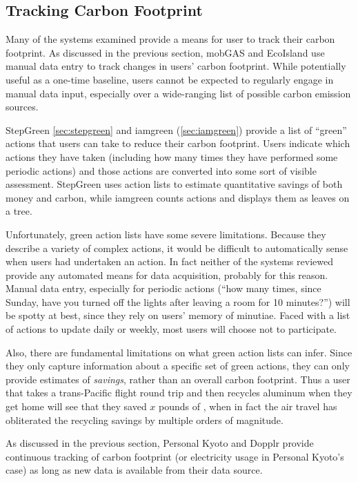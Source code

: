\subsection{Tracking Carbon Footprint}

Many of the systems examined provide a means for user to track their carbon footprint. As discussed in the previous section, mobGAS and  EcoIsland use manual data entry to track changes in users' carbon footprint. While potentially useful as a one-time baseline, users cannot be expected to regularly engage in manual data input, especially over a wide-ranging list of possible carbon emission sources.

StepGreen \autoref{sec:stepgreen} and iamgreen (\autoref{sec:iamgreen}) provide a list of ``green'' actions that users can take to reduce their carbon footprint. Users indicate which actions they have taken (including how many times they have performed some periodic actions) and those actions are converted into some sort of visible assessment. StepGreen uses action lists to estimate quantitative savings of both money and carbon, while iamgreen counts actions and displays them as leaves on a tree.

Unfortunately, green action lists have some severe limitations. Because they describe a variety of complex actions, it would be difficult to automatically sense when users had undertaken an action. In fact neither of the systems reviewed provide any automated means for data acquisition, probably for this reason. Manual data entry, especially for periodic actions (``how many times, since Sunday, have you turned off the lights after leaving a room for 10 minutes?'') will be spotty at best, since they rely on users' memory of minutiae. Faced with a list of actions to update daily or weekly, most users will choose not to participate.

Also, there are fundamental limitations on what green action lists can infer. Since they only capture information about a specific set of green actions, they can only provide estimates of \emph{savings}, rather than an overall carbon footprint. Thus a user that takes a trans-Pacific flight round trip and then recycles aluminum when they get home will see that they saved $x$ pounds of \COtwo, when in fact the air travel has obliterated the recycling savings by multiple orders of magnitude.

As discussed in the previous section, Personal Kyoto and Dopplr provide continuous tracking of carbon footprint (or electricity usage in Personal Kyoto's case) as long as new data is available from their data source.


